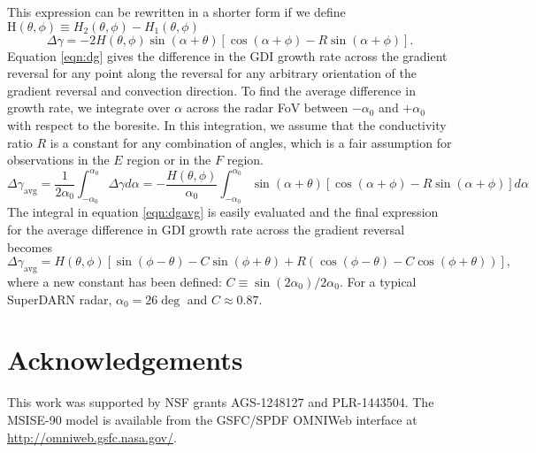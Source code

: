 \begin{subappendices}
This expression can be rewritten in a shorter form if we define \(\mathrm{H}(\theta,\phi)\equiv H_2(\theta,\phi) - H_1(\theta,\phi)\) 
\begin{equation}
\label{eqn:dg}
\Delta\gamma = -2H(\theta,\phi)\sin(\alpha+\theta)[\cos(\alpha+\phi)-R\sin(\alpha+\phi)].
\end{equation}
Equation \ref{eqn:dg} gives the difference in the GDI growth rate across the gradient reversal for any point along the reversal for any arbitrary orientation of the gradient reversal and convection direction. To find the average difference in growth rate, we integrate over \(\alpha\) across the radar FoV between \(-\alpha_0\) and \(+\alpha_0\) with respect to the boresite. In this integration, we assume that the conductivity ratio \(R\) is a constant for any combination of angles, which is a fair assumption for observations in the \(E\) region or in the \(F\) region. 
\begin{equation}
\label{eqn:dgavg}
\Delta\gamma_{\mathrm{avg}} = \frac{1}{2\alpha_0}\int_{-\alpha_0}^{\alpha_0}\Delta\gamma d\alpha = -\frac{H(\theta,\phi)}{\alpha_0}\int_{-\alpha_0}^{\alpha_0}\sin(\alpha+\theta)[\cos(\alpha+\phi)-R\sin(\alpha+\phi)]d\alpha
\end{equation}
The integral in equation \ref{eqn:dgavg} is easily evaluated and the final expression for the average difference in GDI growth rate across the gradient reversal becomes
\begin{equation}
\Delta\gamma_{\mathrm{avg}} = H(\theta,\phi)\left[\sin(\phi-\theta)-C\sin(\phi+\theta)+R\left(\cos(\phi-\theta)-C\cos(\phi+\theta)\right)\right], 
\end{equation}
where a new constant  has been defined: \(C\equiv\sin(2\alpha_0)/2\alpha_0\). For a typical SuperDARN radar, \(\alpha_0=26\deg\) and \(C\approx 0.87\).

\end{subappendices}


\section*{Acknowledgements}
This work was supported by NSF grants AGS-1248127 and PLR-1443504. The MSISE-90 model is available from the GSFC/SPDF OMNIWeb interface at \url{http://omniweb.gsfc.nasa.gov/}.






